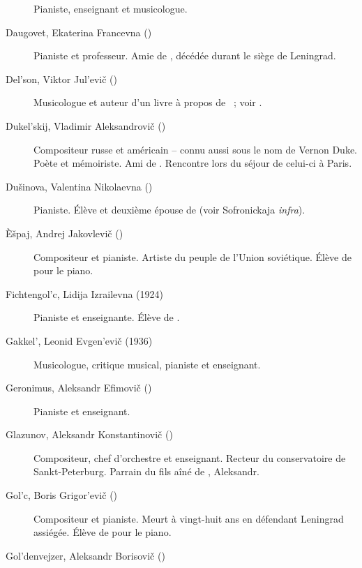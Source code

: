 \begin{description}
 Pianiste, enseignant et musicologue.
 \item[Daugovet, Ekaterina Francevna (\Dates{1882}{1942})]%
 Pianiste et professeur.
 Amie de \VSofronitsky{}, décédée durant le siège de Leningrad.
 \item[Del'son, Viktor Jul'evič (\Dates{1907}{1970})]%
 Musicologue et auteur d'un livre à propos de \VSofronitsky{}~; voir
 \citet{Delson59, Delson70}.
 \item[Dukel'skij, Vladimir Aleksandrovič (\Dates{1903}{1969})]%
 Compositeur russe et américain -- connu aussi sous le nom de Vernon Duke.
 Poète et mémoiriste.
 Ami de \SProkofiev{}.
 Rencontre \VSofronitsky{} lors du séjour de celui-ci à Paris.
 \item[Dušinova, Valentina Nikolaevna (\Dates{1921}{1964})]%
 Pianiste.
 Élève et deuxième épouse de \VSofronitsky{} (voir Sofronickaja
 \emph{infra}).
 \item[Èšpaj, Andrej Jakovlevič (\Dates{1925}{2015})]%
 Compositeur et pianiste.
 Artiste du peuple de l'\hbox{Union} soviétique.
 Élève de \VSofronitsky{} pour le piano.
 \item[Fichtengol'c, Lidija Izrailevna (1924\dvsborn{})]%
 Pianiste et enseignante.
 Élève de \HNeuhaus{}.
 \item[Gakkel', Leonid Evgen'evič (1936\dvsborn{})]%
 Musicologue, critique musical, pianiste et enseignant.
 \item[Geronimus, Aleksandr Efimovič (\Dates{1908}{1980})]%
 Pianiste et enseignant.
 \item[Glazunov, Aleksandr Konstantinovič (\Dates{1865}{1936})]%
 Compositeur, chef d'orchestre et enseignant.
 Recteur du conservatoire de Sankt-Peterburg.
 Parrain du fils aîné de \VSofronitsky{}, Aleksandr.
 \item[Gol'c, Boris Grigor'evič (\Dates{1913}{1942})]%
 Compositeur et pianiste.
 Meurt à vingt-huit ans en défendant Leningrad assiégée.
 Élève de \LNikolaiev{} pour le piano.
 \item[Gol'denvejzer, Aleksandr Borisovič (\Dates{1875}{1961})]%

\end{description}
